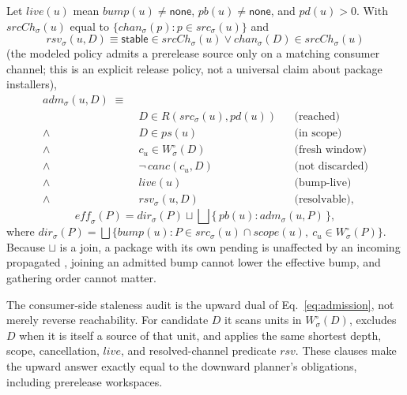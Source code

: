 \begin{definition}
\label{def:adm}
Let $\mathit{live}(u)$ mean $\mathit{bump}(u)\neq\mathsf{none}$,
$\mathit{pb}(u)\neq\mathsf{none}$, and $\mathit{pd}(u)>0$. With
$\mathit{srcCh}_\sigma(u)$ equal to
$\{\mathit{chan}_\sigma(p) : p \in \mathit{src}_\sigma(u)\}$ and
\begin{equation}
  \mathit{rsv}_\sigma(u,D) \equiv \mathsf{stable} \in
  \mathit{srcCh}_\sigma(u) \lor \mathit{chan}_\sigma(D) \in
  \mathit{srcCh}_\sigma(u)
  \label{eq:resolvable}
\end{equation}
(the modeled policy admits a prerelease source only on a matching
consumer channel; this is an explicit release policy, not a universal
claim about package installers),
\begin{equation}
\label{eq:admission}
\begin{aligned}
  \mathit{adm}_\sigma(u,D) \;\equiv\; & \\[-0pt]
     & D \in R(\mathit{src}_\sigma(u), \mathit{pd}(u))
     &\!\!& \text{(reached)} \\
  \wedge\;\; & D \in \mathit{ps}(u)
     &\!\!& \text{(in scope)} \\
  \wedge\;\; & c_u \in W^\circ_\sigma(D)
     &\!\!& \text{(fresh window)} \\
  \wedge\;\; & \neg\,\mathit{canc}(c_u, D)
     &\!\!& \text{(not discarded)} \\
  \wedge\;\; & \mathit{live}(u)
     &\!\!& \text{(bump-live)} \\
  \wedge\;\; & \mathit{rsv}_\sigma(u, D)
     &\!\!& \text{(resolvable),}
\end{aligned}
\end{equation}
\begin{equation}
\label{eq:effective}
  \mathit{eff}_\sigma(P) = \mathit{dir}_\sigma(P) \sqcup
  \bigsqcup \{\, \mathit{pb}(u) : \mathit{adm}_\sigma(u,P) \,\},
\end{equation}
where $\mathit{dir}_\sigma(P) = \bigsqcup\{\mathit{bump}(u) : P \in
\mathit{src}_\sigma(u) \cap \mathit{scope}(u),\ c_u \in W^\circ_\sigma(P)\}$.
Because $\sqcup$ is a join, a package with its own  pending
is unaffected by an incoming propagated , joining an admitted bump cannot lower the effective bump, and gathering order cannot matter.
\end{definition}

The consumer-side staleness audit is the upward dual of
Eq.~\ref{eq:admission}, not merely reverse reachability. For candidate $D$
it scans units in $W^\circ_\sigma(D)$, excludes $D$ when it is itself a
source of that unit, and applies the same shortest depth, scope,
cancellation, $\mathit{live}$, and resolved-channel predicate $\mathit{rsv}$. These clauses
make the upward answer exactly equal to the downward planner's obligations,
including prerelease workspaces.

